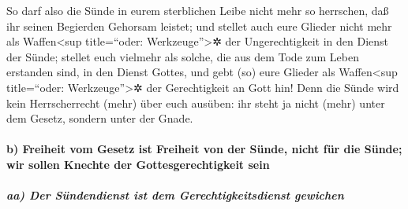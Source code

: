  So darf also die Sünde in eurem sterblichen Leibe nicht
mehr so herrschen, daß ihr seinen Begierden Gehorsam leistet;
 und stellet auch eure Glieder nicht mehr als
Waffen\textless sup title=``oder: Werkzeuge''\textgreater✲ der
Ungerechtigkeit in den Dienst der Sünde; stellet euch vielmehr als
solche, die aus dem Tode zum Leben erstanden sind, in den Dienst Gottes,
und gebt (so) eure Glieder als Waffen\textless sup title=``oder:
Werkzeuge''\textgreater✲ der Gerechtigkeit an Gott hin! 
Denn die Sünde wird kein Herrscherrecht (mehr) über euch ausüben: ihr
steht ja nicht (mehr) unter dem Gesetz, sondern unter der Gnade.

\hypertarget{b-freiheit-vom-gesetz-ist-freiheit-von-der-suxfcnde-nicht-fuxfcr-die-suxfcnde-wir-sollen-knechte-der-gottesgerechtigkeit-sein}{%
\paragraph{b) Freiheit vom Gesetz ist Freiheit von der Sünde, nicht für
die Sünde; wir sollen Knechte der Gottesgerechtigkeit
sein}\label{b-freiheit-vom-gesetz-ist-freiheit-von-der-suxfcnde-nicht-fuxfcr-die-suxfcnde-wir-sollen-knechte-der-gottesgerechtigkeit-sein}}

\hypertarget{aa-der-suxfcndendienst-ist-dem-gerechtigkeitsdienst-gewichen}{%
\subparagraph{aa) Der Sündendienst ist dem Gerechtigkeitsdienst
gewichen}\label{aa-der-suxfcndendienst-ist-dem-gerechtigkeitsdienst-gewichen}}

